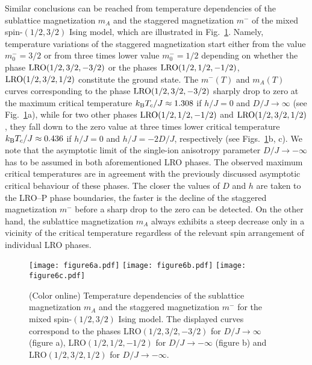 \documentclass[final,5p,times,sort&compress]{elsarticle}
\begin{document}
Similar conclusions can be reached from temperature dependencies of the sublattice magnetization $m_A$ and the staggered magnetization $m^{-}$ of the mixed spin-$(1/2, 3/2)$ Ising mo\-del, which are illustrated in Fig.~\ref{fig:6}. Namely, temperature variations of the staggered magnetization start either from the value $m^{-}_{0} = 3/2$ or from three times lower value $m^{-}_{0} =1/2$ depending on whether the phase ${\rm LRO}(1/2, 3/2, -3/2)$ or the phases ${\rm LRO}(1/2, 1/2, -1/2)$, ${\rm LRO}(1/2, 3/2, 1/2)$ constitute the ground state. The $m^{-}(T)$ and $m_A(T)$ curves corresponding to the phase ${\rm LRO}(1/2, 3/2, -3/2)$ sharply drop to zero at the maximum critical temperature $k_{\rm B}T_c/J \approx 1.308$ if $h/J = 0$ and $D/J\to\infty$ (see Fig.~\ref{fig:6}a), while for two other phases ${\rm LRO}(1/2, 1/2, -1/2)$ and ${\rm LRO}(1/2, 3/2, 1/2)$, they fall down to the zero value at three times lower critical temperature $k_{\rm B}T_c/J \approx 0.436$ if $h/J = 0$ and $h/J=-2D/J$, respectively (see Figs.~\ref{fig:6}b, c). We note that the asymptotic limit of the single-ion anisotropy parameter $D/J\to-\infty$ has to be assumed in both aforementioned LRO phases. The observed maximum critical temperatures are in agreement with the previously discussed asymptotic critical behaviour of these phases. The closer the values of $D$ and $h$ are taken to the LRO--P phase boundaries, the faster is the decline of the staggered magnetization $m^{-}$ before a sharp drop to the zero can be detected. On the other hand, the sublattice magnetization $m_A$ always exhibits a steep decrease only in a vicinity of the critical temperature regardless of the relevant spin arrangement of individual LRO phases.
\begin{figure}[t!]
\vspace{0.25cm}
\centering
  \texttt{[image: figure6a.pdf]}\vspace{1mm}
  \texttt{[image: figure6b.pdf]}\vspace{1mm}
  \texttt{[image: figure6c.pdf]}
\vspace{-0.15cm}
\caption{(Color online) Temperature dependencies of the sublattice magnetization $m_A$ and the staggered magnetization $m^{-}$ for the mixed spin-$(1/2,3/2)$ Ising model. The displayed curves correspond to the phases LRO$(1/2,3/2,-3/2)$ for $D/J\to\infty$ (figure a), LRO$(1/2,1/2,-1/2)$ for $D/J\to-\infty$ (figure b) and LRO$(1/2,3/2,1/2)$ for $D/J\to-\infty$.
}
\label{fig:6}
\vspace{-0.75cm}
\end{figure}
\end{document}
